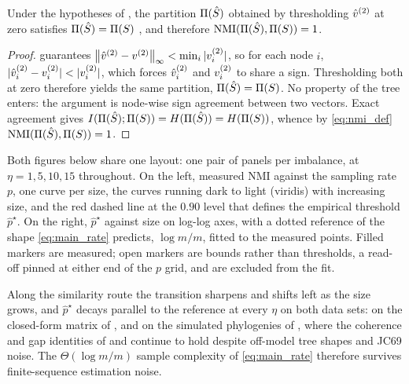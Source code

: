 \begin{corollary}[Perfect partition recovery and $\mathrm{NMI}=1$]\label{cor:nmi}
Under the hypotheses of , the partition $\Pi(\hat S)$ obtained by thresholding $\hat v^{(2)}$ at zero satisfies $\Pi(\hat S)=\Pi(S)$ \hp, and therefore $\mathrm{NMI}(\Pi(\hat S),\Pi(S))=1$.
\end{corollary}
\begin{proof}
 guarantees $\left\lVert \hat v^{(2)}-v^{(2)} \right\rVert_\infty<\min_i|v^{(2)}_i|$, so for each node $i$, $|\vvh_i-\vv_i|<|\vv_i|$, which forces $\hat v^{(2)}_i$ and $v^{(2)}_i$ to share a sign. Thresholding both at zero therefore yields the same partition, $\Pi(\hat S)=\Pi(S)$. No property of the tree enters: the argument is node-wise sign agreement between two vectors. Exact agreement gives $I(\Pi(\hat S);\Pi(S))=H(\Pi(\hat S))=H(\Pi(S))$, whence by \eqref{eq:nmi_def} $\mathrm{NMI}(\Pi(\hat S),\Pi(S))=1$.
\end{proof}

Both figures below share one layout: one pair of panels per imbalance, at $\eta=1,5,10,15$ throughout. On the left, measured NMI against the sampling rate $p$, one curve per size, the curves running dark to light (viridis) with increasing size, and the red dashed line at the $0.90$ level that defines the empirical threshold $\hat p^\star$. On the right, $\hat p^\star$ against size on log-log axes, with a dotted reference of the shape \eqref{eq:main_rate} predicts, $\log m/m$, fitted to the measured points. Filled markers are measured; open markers are bounds rather than thresholds, a read-off pinned at either end of the $p$ grid, and are excluded from the fit.

Along the similarity route the transition sharpens and shifts left as the size grows, and $\hat p^\star$ decays parallel to the reference at every $\eta$ on both data sets: on the closed-form matrix of , and on the simulated phylogenies of , where the coherence and gap identities of  and  continue to hold despite off-model tree shapes and JC69 noise. The $\Theta(\log m/m)$ sample complexity of \eqref{eq:main_rate} therefore survives finite-sequence estimation noise.

